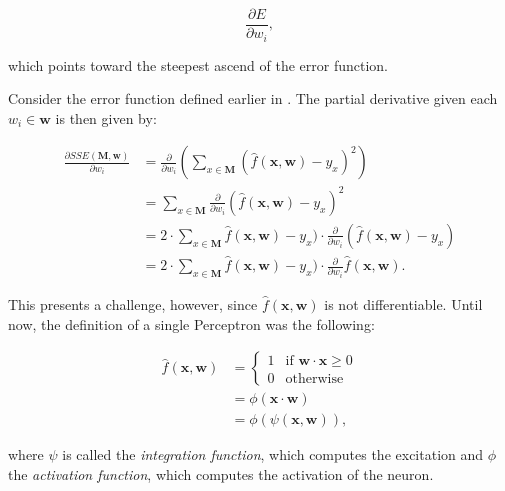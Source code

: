 \begin{equation}
    \frac{\partial E}{\partial w_i},
\end{equation}

which points toward the steepest ascend of the error function.

Consider the error function defined earlier in .
The partial derivative given each $w_i \in \bm{w}$ is then given by:

\begin{equation}
    \label{eq:error-derivative-1}
    \begin{split}
        \frac{\partial SSE(\bm{M}, \bm{w})}{\partial w_i}
        &= \frac{\partial }{\partial w_i} \left( \sum_{x \in \bm{M}} (\hat{f}(\bm{x},\bm{w}) - y_x)^2 \right) \\
        &= \sum_{x \in \bm{M}} \frac{\partial }{\partial w_i} (\hat{f}(\bm{x},\bm{w}) - y_x)^2 \\
        &= 2 \cdot \sum_{x \in \bm{M}} \hat{f}(\bm{x},\bm{w}) - y_x) \cdot  \frac{\partial }{\partial w_i} (\hat{f}(\bm{x}, \bm{w}) - y_x) \\
        &= 2 \cdot \sum_{x \in \bm{M}} \hat{f}(\bm{x},\bm{w}) - y_x) \cdot  \frac{\partial }{\partial w_i} \hat{f}(\bm{x}, \bm{w}).
    \end{split}
\end{equation}

This presents a challenge, however, since $\hat{f}(\bm{x}, \bm{w})$ is not differentiable.
Until now, the definition of a single Perceptron was the following:

\begin{equation}
    \begin{split}
        \hat{f}(\bm{x}, \bm{w})
        &=
            \begin{cases}
                1 & \text{if } \bm{w} \cdot \bm{x} \geq 0 \\
                0 & \text{otherwise}
            \end{cases}
        \\
        &= \phi(\bm{x} \cdot \bm{w})
        \\
        &= \phi(\psi(\bm{x}, \bm{w})),
    \end{split}
\end{equation}

where $\psi$ is called the \textit{integration function}, which computes the excitation and $\phi$ the \textit{activation function}, which computes the activation of the neuron.

